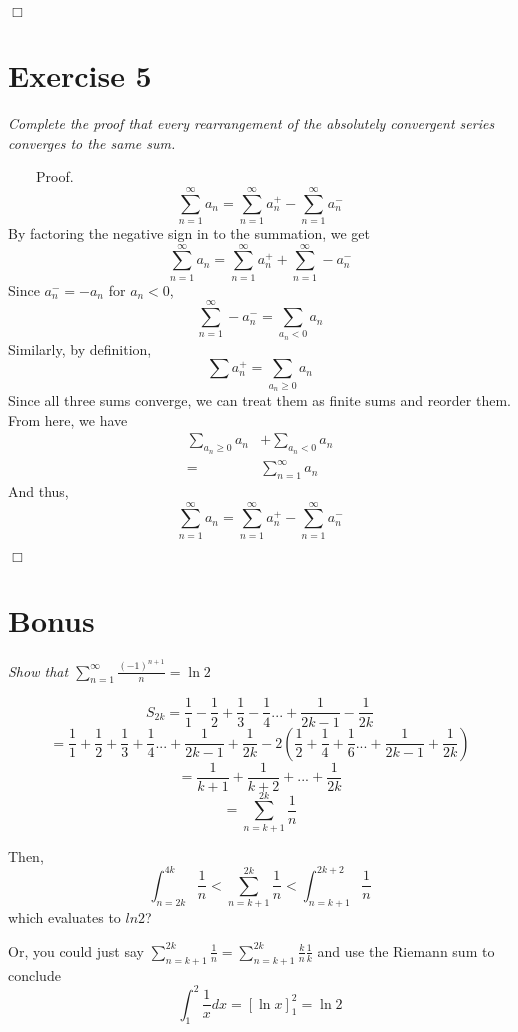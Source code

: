 \documentclass[
]{article}
\begin{document}
\hfill \(\Box\)

\hypertarget{exercise-5}{%
\section{Exercise 5}\label{exercise-5}}

\textit{Complete the proof that every rearrangement of the absolutely convergent series converges to the same sum.}

~~~~Proof.
\[\sum ^ \infty _ {n=1} a_n = \sum ^ \infty _ {n=1} a_n ^ + - \sum ^ \infty _ {n=1} a_n ^ -\]
By factoring the negative sign in to the summation, we get
\[\sum ^ \infty _ {n=1} a_n = \sum ^ \infty _ {n=1} a_n ^ + + \sum ^ \infty _ {n=1} - a_n ^ -\]
Since \(a_n ^- = -a_n\) for \(a_n < 0\),
\[\sum ^ \infty _ {n=1} - a_n ^ - = \sum _{a_n < 0} a_n\] Similarly, by
definition, \[\sum a_n ^ + = \sum _{a_n \geq 0} a_n\] Since all three
sums converge, we can treat them as finite sums and reorder them. From
here, we have \[\begin{aligned} 
\sum _{a_n \geq 0} a_n &+ \sum _{a_n < 0} a_n \\
= &\sum _ {n = 1} ^ \infty a_n
\end{aligned}\] And thus,
\[\sum ^ \infty _ {n=1} a_n = \sum ^ \infty _ {n=1} a_n ^ + - \sum ^ \infty _ {n=1} a_n ^ -\]

\hfill \(\Box\)

\hypertarget{bonus}{%
\section{Bonus}\label{bonus}}

\textit{Show that $\sum^\infty_{n=1}\frac{(-1)^{n+1}}{n} = \ln 2$}

\[S_{2k}=
\frac{1}{1} - \frac{1}{2} + \frac{1}{3} - \frac{1}{4} ... +\frac{1}{2k-1} - \frac{1}{2k}\]
\[ = \frac{1}{1} + \frac{1}{2} + \frac{1}{3} + \frac{1}{4} ... +\frac{1}{2k-1} + \frac{1}{2k} 
- 2(\frac{1}{2} + \frac{1}{4} + \frac{1}{6} ... +\frac{1}{2k-1} + \frac{1}{2k})\]
\[= \frac{1}{k+1} + \frac{1}{k+2} + ... + \frac{1}{2k}\]
\[= \sum ^{2k} _ {n=k+1} \frac{1}{n}\]

Then,
\[\int ^{4k} _ {n=2k} \frac{1}{n}< \sum ^{2k} _ {n=k+1} \frac{1}{n} < \int ^{2k + 2} _ {n=k+1} \frac{1}{n}\]
which evaluates to \(ln2\)?

Or, you could just say
\(\sum ^{2k} _ {n=k+1} \frac{1}{n} = \sum ^{2k} _ {n=k+1} \frac{k}{n}\frac{1}{k}\)
and use the Riemann sum to conclude
\[\int ^2 _1 \frac{1}{x} dx = [\ln x]^2 _1 = \ln2\]
\end{document}
